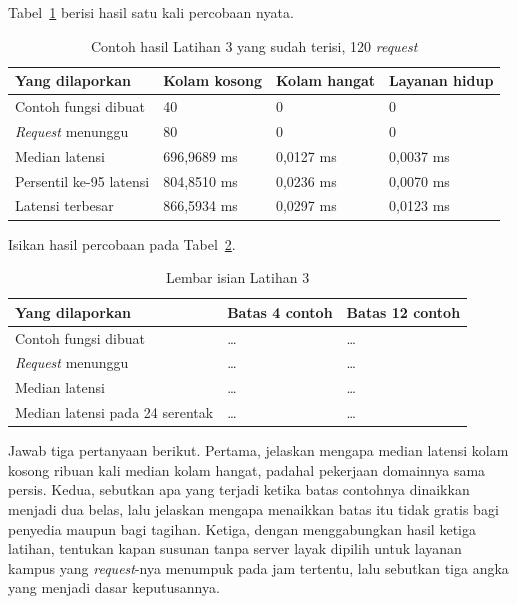 Tabel~\ref{tab:lat3serverless-contoh} berisi hasil satu kali percobaan nyata.

\begin{table}[htbp]
  \centering
  \caption{Contoh hasil Latihan 3 yang sudah terisi, 120 \textit{request}}
  \label{tab:lat3serverless-contoh}
  \begin{tabularx}{\textwidth}{|X|l|l|l|}
    \hline
    \textbf{Yang dilaporkan} & \textbf{Kolam kosong} & \textbf{Kolam hangat} & \textbf{Layanan hidup} \\
    \hline
    Contoh fungsi dibuat & 40 & 0 & 0 \\
    \hline
    \textit{Request} menunggu & 80 & 0 & 0 \\
    \hline
    Median latensi & 696,9689 ms & 0,0127 ms & 0,0037 ms \\
    \hline
    Persentil ke-95 latensi & 804,8510 ms & 0,0236 ms & 0,0070 ms \\
    \hline
    Latensi terbesar & 866,5934 ms & 0,0297 ms & 0,0123 ms \\
    \hline
  \end{tabularx}
\end{table}

Isikan hasil percobaan pada Tabel~\ref{tab:lat3serverless-hasil}.

\begin{table}[htbp]
  \centering
  \caption{Lembar isian Latihan 3}
  \label{tab:lat3serverless-hasil}
  \begin{tabularx}{\textwidth}{|X|l|l|}
    \hline
    \textbf{Yang dilaporkan} & \textbf{Batas 4 contoh} & \textbf{Batas 12 contoh} \\
    \hline
    Contoh fungsi dibuat & \dots & \dots \\
    \hline
    \textit{Request} menunggu & \dots & \dots \\
    \hline
    Median latensi & \dots & \dots \\
    \hline
    Median latensi pada 24 serentak & \dots & \dots \\
    \hline
  \end{tabularx}
\end{table}

Jawab tiga pertanyaan berikut. Pertama, jelaskan mengapa median latensi kolam
kosong ribuan kali median kolam hangat, padahal pekerjaan domainnya sama
persis. Kedua, sebutkan apa yang terjadi ketika batas contohnya dinaikkan
menjadi dua belas, lalu jelaskan mengapa menaikkan batas itu tidak gratis bagi
penyedia maupun bagi tagihan. Ketiga, dengan menggabungkan hasil ketiga
latihan, tentukan kapan susunan tanpa server layak dipilih untuk layanan kampus
yang \textit{request}-nya menumpuk pada jam tertentu, lalu sebutkan tiga angka yang
menjadi dasar keputusannya.
